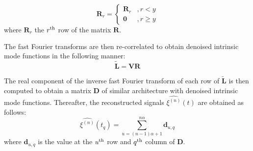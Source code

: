 \documentclass[onecolumn, groupedaddress, 10pt]{revtex4-1}
\begin{document}
\begin{displaymath}
   \mathbf{R}_r = \left\{
     \begin{array}{lr}
        \mathbf{R}_r & , r < y     \\
       \mathbf{0} & , r \geq y
     \end{array}
   \right.
\end{displaymath}
where $\mathbf{R}_r$ the $r^{\textnormal{th}}$ row of the matrix $\mathbf{R}$.

The fast Fourier transforms are then re-correlated to obtain denoised intrinsic mode functions in the following manner:
\begin{equation}
\tilde{ \mathbf{L} } = \mathbf{V}\mathbf{R}
\end{equation}

The real component of the inverse fast Fourier transform of each row of $\mathbf{\tilde{L}}$ is then computed to obtain a matrix $\mathbf{D}$ of similar architecture with denoised intrinsic mode functions. Thereafter, the reconstructed signals $\hat{\xi^{(n)}}(t)$ are obtained as follows:
\begin{equation}
\hat{\xi^{(n)}}(t_{q}) = \sum_{u = (n-1)\alpha + 1}^{n\alpha} \mathbf{d}_{u,q}
\end{equation}
where $\mathbf{d}_{u,q}$ is the value at the $u^\textnormal{th}$ row and $q^\textnormal{th}$ column of $\textbf{D}$.
\end{document}
